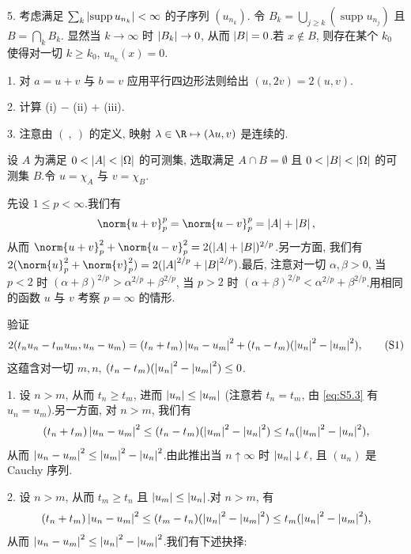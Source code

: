 5. 考虑满足 $\sum_k\left|\operatorname{supp}u_{n_k}\right|<\infty$ 的子序列 $(u_{n_k})$.
令 $B_k=\bigcup_{j\ge k}(\operatorname{supp}u_{n_j})$ 且 $B=\bigcap_kB_k$.
显然当 $k\to\infty$ 时 $\left|B_k\right|\to0$, 从而 $\left|B\right|=0$.若 $x\notin B$,
则存在某个 $k_0$ 使得对一切 $k\ge k_0$, $u_{n_k}(x)=0$.

1. 对 $a=u+v$ 与 $b=v$ 应用平行四边形法则给出 $(u,2v)=2(u,v)$.

2. 计算 (i) $-$ (ii) $+$ (iii).

3. 注意由 $(\ ,\ )$ 的定义, 映射 $\lambda\in\R\mapsto(\lambda u,v)$ 是连续的.


设 $A$ 为满足 $0<\left|A\right|<\left|\Omega\right|$ 的可测集, 选取满足 $A\cap B=\emptyset$ 且
$0<\left|B\right|<\left|\Omega\right|$ 的可测集 $B$.令 $u=\chi_A$ 与 $v=\chi_B$.

先设 $1\le p<\infty$.我们有
\begin{equation*}
\norm{u+v}_p^p=\norm{u-v}_p^p=\abs{A}+\abs{B},
\end{equation*}
从而 $\norm{u+v}_p^2+\norm{u-v}_p^2=2(\abs{A}+\abs{B})^{2/p}$.另一方面,
我们有 $2(\norm{u}_p^2+\norm{v}_p^2)=2(\abs{A}^{2/p}+\abs{B}^{2/p})$.最后,
注意对一切 $\alpha,\beta>0$, 当 $p<2$ 时
$(\alpha+\beta)^{2/p}>\alpha^{2/p}+\beta^{2/p}$, 当 $p>2$ 时
$(\alpha+\beta)^{2/p}<\alpha^{2/p}+\beta^{2/p}$.用相同的函数 $u$ 与 $v$
考察 $p=\infty$ 的情形.


验证
\begin{equation}
2(t_nu_n-t_mu_m,u_n-u_m)=(t_n+t_m)\left|u_n-u_m\right|^2+(t_n-t_m)(\left|u_n\right|^2-\left|u_m\right|^2),
\tag{S1}
\label{eq:S5.3}
\end{equation}
这蕴含对一切 $m,n$, $(t_n-t_m)(\left|u_n\right|^2-\left|u_m\right|^2)\le0$.

1. 设 $n>m$, 从而 $t_n\ge t_m$, 进而 $\left|u_n\right|\le\left|u_m\right|$ (注意若
$t_n=t_m$, 由 \eqref{eq:S5.3} 有 $u_n=u_m$).另一方面, 对 $n>m$, 我们有
\begin{equation*}
(t_n+t_m)\left|u_n-u_m\right|^2\le(t_n-t_m)(\left|u_m\right|^2-\left|u_n\right|^2)\le t_n(\left|u_m\right|^2-\left|u_n\right|^2),
\end{equation*}
从而 $\left|u_n-u_m\right|^2\le\left|u_m\right|^2-\left|u_n\right|^2$.由此推出当 $n\uparrow\infty$
时 $\left|u_n\right|\downarrow\ell$, 且 $(u_n)$ 是 Cauchy 序列.

2. 设 $n>m$, 从而 $t_m\ge t_n$ 且 $\left|u_m\right|\le\left|u_n\right|$.对 $n>m$, 有
\begin{equation*}
(t_n+t_m)\left|u_n-u_m\right|^2\le(t_m-t_n)(\left|u_n\right|^2-\left|u_m\right|^2)\le t_m(\left|u_n\right|^2-\left|u_m\right|^2),
\end{equation*}
从而 $\left|u_n-u_m\right|^2\le\left|u_n\right|^2-\left|u_m\right|^2$.我们有下述抉择:

